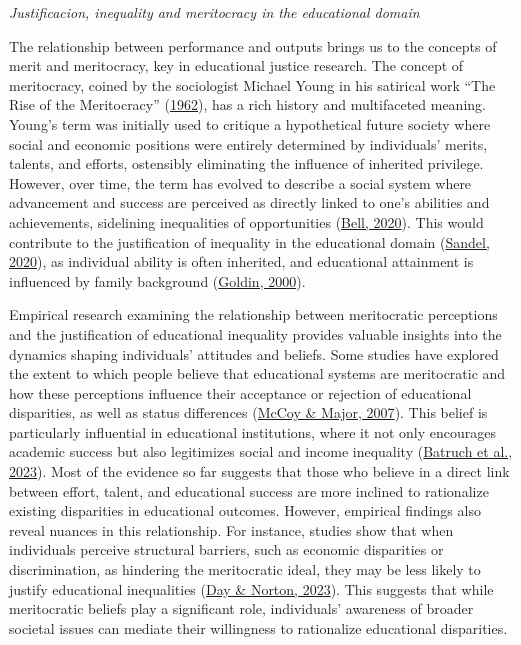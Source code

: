 \documentclass[
  12pt,
  a4paper,
]{article}
\begin{document}
\emph{Justificacion, inequality and meritocracy in the educational
domain}

The relationship between performance and outputs brings us to the
concepts of merit and meritocracy, key in educational justice research.
The concept of meritocracy, coined by the sociologist Michael Young in
his satirical work ``The Rise of the Meritocracy''
(\protect\hyperlink{ref-young_rise_1962}{1962}), has a rich history and
multifaceted meaning. Young's term was initially used to critique a
hypothetical future society where social and economic positions were
entirely determined by individuals' merits, talents, and efforts,
ostensibly eliminating the influence of inherited privilege. However,
over time, the term has evolved to describe a social system where
advancement and success are perceived as directly linked to one's
abilities and achievements, sidelining inequalities of opportunities
(\protect\hyperlink{ref-bell_politics_2020}{Bell, 2020}). This would
contribute to the justification of inequality in the educational domain
(\protect\hyperlink{ref-sandel_tyranny_2020}{Sandel, 2020}), as
individual ability is often inherited, and educational attainment is
influenced by family background
(\protect\hyperlink{ref-goldin_meritocracy_2000}{Goldin, 2000}).

Empirical research examining the relationship between meritocratic
perceptions and the justification of educational inequality provides
valuable insights into the dynamics shaping individuals' attitudes and
beliefs. Some studies have explored the extent to which people believe
that educational systems are meritocratic and how these perceptions
influence their acceptance or rejection of educational disparities, as
well as status differences (\protect\hyperlink{ref-McCoy2007}{McCoy \&
Major, 2007}). This belief is particularly influential in educational
institutions, where it not only encourages academic success but also
legitimizes social and income inequality
(\protect\hyperlink{ref-batruch_belief_2023}{Batruch et al., 2023}).
Most of the evidence so far suggests that those who believe in a direct
link between effort, talent, and educational success are more inclined
to rationalize existing disparities in educational outcomes. However,
empirical findings also reveal nuances in this relationship. For
instance, studies show that when individuals perceive structural
barriers, such as economic disparities or discrimination, as hindering
the meritocratic ideal, they may be less likely to justify educational
inequalities
(\protect\hyperlink{ref-dayPerceivedIdealInequality2023}{Day \& Norton,
2023}). This suggests that while meritocratic beliefs play a significant
role, individuals' awareness of broader societal issues can mediate
their willingness to rationalize educational disparities.
\end{document}

